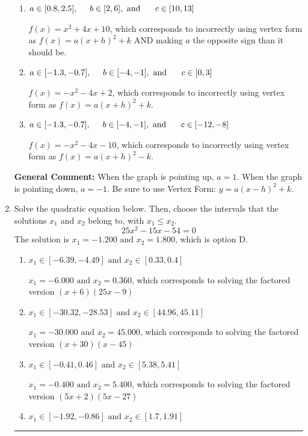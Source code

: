\documentclass{extbook}[14pt]
\newcommand{\litem}[1]{\item #1

\rule{\textwidth}{0.4pt}}
\begin{document}
\begin{enumerate}
{\begin{enumerate}[label=\Alph*.]
* $f(x)=-x^{2} +4 x + 2$, which is the correct option.
\item \( a \in [0.8, 2.5], \hspace*{5mm} b \in [2, 6], \text{ and } \hspace*{5mm} c \in [10, 13] \)

$f(x)=x^{2} +4 x + 10$, which corresponds to incorrectly using vertex form as $f(x) = a(x+h)^2+k$ AND making $a$ the opposite sign than it should be.
\item \( a \in [-1.3, -0.7], \hspace*{5mm} b \in [-4, -1], \text{ and } \hspace*{5mm} c \in [0, 3] \)

$f(x)=-x^{2} -4 x + 2$, which corresponds to incorrectly using vertex form as $f(x) = a(x+h)^2+k$.
\item \( a \in [-1.3, -0.7], \hspace*{5mm} b \in [-4, -1], \text{ and } \hspace*{5mm} c \in [-12, -8] \)

$f(x)=-x^{2} -4 x -10$, which corresponds to incorrectly using vertex form as $f(x) = a(x+h)^2 - k$.
\end{enumerate}

\textbf{General Comment:} When the graph is pointing up, $a=1$. When the graph is pointing down, $a=-1$. Be sure to use Vertex Form: $y = a(x-h)^2+k$.
}
\litem{
Solve the quadratic equation below. Then, choose the intervals that the solutions $x_1$ and $x_2$ belong to, with $x_1 \leq x_2$.
\[ 25x^{2} -15 x -54 = 0 \]The solution is \( x_1 = -1.200 \text{ and } x_2 = 1.800 \), which is option D.\begin{enumerate}[label=\Alph*.]
\item \( x_1 \in [-6.39, -4.49] \text{ and } x_2 \in [0.33, 0.4] \)

$x_1 = -6.000 \text{ and } x_2 = 0.360$, which corresponds to solving the factored version $(x + 6)(25x -9)$
\item \( x_1 \in [-30.32, -28.53] \text{ and } x_2 \in [44.96, 45.11] \)

$x_1 = -30.000 \text{ and } x_2 = 45.000$, which corresponds to solving the factored version $(x + 30)(x -45)$
\item \( x_1 \in [-0.41, 0.46] \text{ and } x_2 \in [5.38, 5.41] \)

$x_1 = -0.400 \text{ and } x_2 = 5.400$, which corresponds to solving the factored version $(5x + 2)(5x -27)$
\item \( x_1 \in [-1.92, -0.86] \text{ and } x_2 \in [1.7, 1.91] \)


\end{enumerate}}
\end{enumerate}
\end{document}
